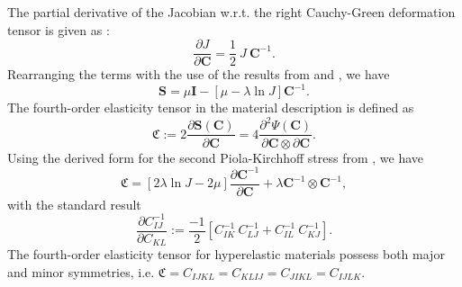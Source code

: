 The partial derivative of the Jacobian w.r.t. the right Cauchy-Green deformation tensor is given as \cite[see][page 46 Equation (3.124)]{Wriggers2008}:
\begin{equation}
\dfrac{\partial J}{\partial \mathbf{C}} = \dfrac{1}{2} \ J \ \mathbf{C}^{-1}.
\label{eq:2.5}
\end{equation}
Rearranging the terms with the use of the results from  and , we have
\begin{equation}
\mathbf{S} = \mu \mathbf{I} - \left[ \mu - \lambda \ln J \right] \mathbf{C}^{-1}.
\label{eq:2.6}
\end{equation}
The fourth-order elasticity tensor in the material description is defined as 
\begin{equation}
\mathfrak{C} := 2 \dfrac{\partial \mathbf{S}(\mathbf{C})}{\partial \mathbf{C}} = 4 \dfrac{\partial^2 \Psi (\mathbf{C})}{\partial \mathbf{C} \otimes \partial \mathbf{C}}.
\label{eq:2.6.2}
\end{equation}
Using the derived form for the second Piola-Kirchhoff stress from , we have
\begin{equation}
\mathfrak{C} = \left[ 2 \lambda \ln J - 2 \mu \right]\dfrac{\partial \mathbf{C}^{-1}}{\partial \mathbf{C}} + \lambda \mathbf{C}^{-1} \otimes \mathbf{C}^{-1},
\end{equation}
with the standard result \cite[see][page 519]{Wriggers2008}
\begin{equation}
\dfrac{\partial C^{-1}_{IJ}}{\partial C_{KL}} := \dfrac{-1}{2} \left[ C^{-1}_{IK} \ C^{-1}_{LJ} + C^{-1}_{IL} \ C^{-1}_{KJ} \right].
\end{equation}
The fourth-order elasticity tensor for hyperelastic materials possess both major and minor symmetries, i.e. $\mathfrak{C} = C_{IJKL} = C_{KLIJ} = C_{JIKL} = C_{IJLK}$.

